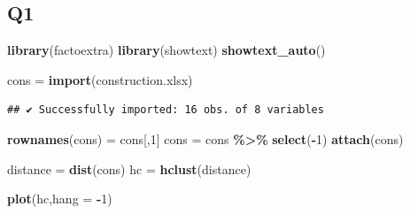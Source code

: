 \documentclass[
]{ctexart}
\newenvironment{Shaded}{\begin{snugshade}}{\end{snugshade}}
\newcommand{\AttributeTok}[1]{\textcolor[rgb]{0.13,0.29,0.53}{#1}}
\newcommand{\DecValTok}[1]{\textcolor[rgb]{0.00,0.00,0.81}{#1}}
\newcommand{\FunctionTok}[1]{\textcolor[rgb]{0.13,0.29,0.53}{\textbf{#1}}}
\newcommand{\NormalTok}[1]{#1}
\newcommand{\OtherTok}[1]{\textcolor[rgb]{0.56,0.35,0.01}{#1}}
\newcommand{\SpecialCharTok}[1]{\textcolor[rgb]{0.81,0.36,0.00}{\textbf{#1}}}
\newcommand{\StringTok}[1]{\textcolor[rgb]{0.31,0.60,0.02}{#1}}
\begin{document}
\hypertarget{q1}{%
\subsection{Q1}\label{q1}}

\begin{Shaded}
\begin{Highlighting}[]
\FunctionTok{library}\NormalTok{(factoextra)}
\FunctionTok{library}\NormalTok{(showtext)}
\FunctionTok{showtext\_auto}\NormalTok{()}
\end{Highlighting}
\end{Shaded}

\begin{Shaded}
\begin{Highlighting}[]
\NormalTok{cons }\OtherTok{=} \FunctionTok{import}\NormalTok{(}\StringTok{\textquotesingle{}construction.xlsx\textquotesingle{}}\NormalTok{)}
\end{Highlighting}
\end{Shaded}

\begin{verbatim}
## ✔ Successfully imported: 16 obs. of 8 variables
\end{verbatim}

\begin{Shaded}
\begin{Highlighting}[]
\FunctionTok{rownames}\NormalTok{(cons) }\OtherTok{=}\NormalTok{ cons[,}\DecValTok{1}\NormalTok{]}
\NormalTok{cons }\OtherTok{=}\NormalTok{ cons }\SpecialCharTok{\%\textgreater{}\%} \FunctionTok{select}\NormalTok{(}\SpecialCharTok{{-}}\DecValTok{1}\NormalTok{)}
\FunctionTok{attach}\NormalTok{(cons)}
\end{Highlighting}
\end{Shaded}

\begin{Shaded}
\begin{Highlighting}[]
\NormalTok{distance }\OtherTok{=} \FunctionTok{dist}\NormalTok{(cons)}
\NormalTok{hc }\OtherTok{=} \FunctionTok{hclust}\NormalTok{(distance)}
\end{Highlighting}
\end{Shaded}

\begin{Shaded}
\begin{Highlighting}[]
\FunctionTok{plot}\NormalTok{(hc,}\AttributeTok{hang =} \SpecialCharTok{{-}}\DecValTok{1}\NormalTok{)}
\end{Highlighting}
\end{Shaded}
\end{document}
